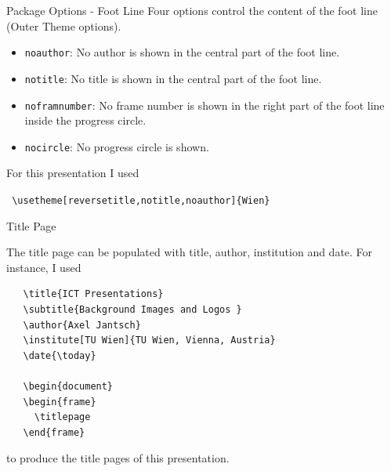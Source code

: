 \documentclass[aspectratio=169]{beamer}
\begin{document}
\begin{frame}[fragile]{Package Options - Foot Line}
   Four options control the content of the foot line (Outer Theme options).
  
\begin{itemize}
\item \texttt{noauthor}: No author is shown in the central part of the
  foot line.
\item \texttt{notitle}: No title is shown in the central part of the
  foot line.
\item \texttt{noframnumber}: No frame number is shown in the right part
  of the foot line inside the progress circle.
\item \texttt{nocircle}: No progress circle is shown.
\end{itemize}

For this presentation I used

\verb| \usetheme[reversetitle,notitle,noauthor]{Wien} |

\end{frame}

\begin{frame}[fragile]{Title Page}

  \begin{block}{}

    The title page can be populated with title, author, institution
    and date. For instance, I used

    \vspace{3ex}

    \hspace{1em}
    \begin{minipage}{0.9\textwidth}
\begin{verbatim}
   \title{ICT Presentations}
   \subtitle{Background Images and Logos }
   \author{Axel Jantsch}
   \institute[TU Wien]{TU Wien, Vienna, Austria}
   \date{\today}

   \begin{document}
   \begin{frame}
     \titlepage
   \end{frame}\end{verbatim}
    \end{minipage}

    \vspace{3ex} to produce the title pages of this presentation.
  \end{block}
\end{frame}
\end{document}
